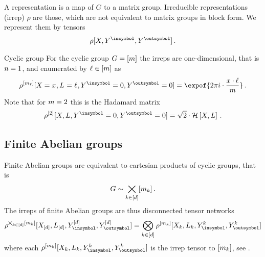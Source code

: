A representation is a map of $G$ to a matrix group.
Irreducible representations (irrep) $\rho$ are those, which are not equivalent to matrix groups in block form.
We represent them by tensors
\begin{align*}
    \rho[\catvariable,\cheadvariable{\insymbol},\cheadvariable{\outsymbol}] \, .
\end{align*}


\begin{example}{Cyclic group}\label{exa:cycGroupIrreps}
    For the cyclic group $G=[m]$ the irreps are one-dimensional, that is $n=1$, and enumerated by $\ell\in[m]$ as
    \begin{align*}
        \rho^{[\catdimof{\selindex}]}[\indexedcatvariable,\indexedselvariable,\cheadvariable{\insymbol}=0,\cheadvariable{\outsymbol}=0]
        = \expof{2\pi i \cdot \frac{\catindex \cdot \selindex}{\catdim}} \, .
    \end{align*}
    Note that for $m=2$ this is the Hadamard matrix
    \begin{align*}
        \rho^{[2]}[\catvariable,\selvariable,\cheadvariable{\insymbol}=0,\cheadvariable{\outsymbol}=0]
        = \sqrt{2} \cdot \hgateat{\catvariable,\selvariable} \, .
    \end{align*}
\end{example}



\subsection{Finite Abelian groups}

Finite Abelian groups are equivalent to cartesian products of cyclic groups, that is
\begin{align*}
    G \sim \bigtimes_{k\in[d]}[m_{k}] \, .
\end{align*}
The irreps of finite Abelian groups are thus disconnected tensor networks
\begin{align*}
    \rho^{\bigtimes_{\catenumeratorin}[\catdimof{\catenumerator}]}[\shortcatvariables,\selvariableof{[\catorder]},\cheadvariableof{\insymbol}{[\catorder]},\cheadvariableof{\outsymbol}{[\catorder]}]
    = \bigotimes_{\catenumeratorin} \rho^{[\catdimof{\catenumerator}]}[\catvariableof{\catenumerator},\selvariableof{\catenumerator},\cheadvariableof{\insymbol}{\catenumerator},\cheadvariableof{\outsymbol}{\catenumerator}]
\end{align*}
where each $\rho^{[\catdimof{\catenumerator}]}[\catvariableof{\catenumerator},\selvariableof{\catenumerator},\cheadvariableof{\insymbol}{\catenumerator},\cheadvariableof{\outsymbol}{\catenumerator}]$ is the irrep tensor to $[m_{k}]$, see .


